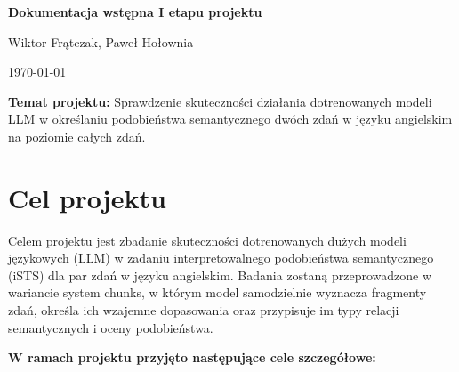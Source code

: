 \documentclass[a4paper,10pt]{article}
\begin{document}
    {\centering
        \setlength{\parskip}{0pt}
        {\Large\bfseries Dokumentacja wstępna I etapu projektu}\par
        Wiktor Frątczak, Paweł Hołownia\par
        \quad\today\par
        \vspace{8pt}
        \textbf{Temat projektu:} Sprawdzenie skuteczności działania dotrenowanych
        modeli LLM w określaniu podobieństwa semantycznego dwóch zdań w języku
        angielskim na poziomie całych zdań.\par
    }


\section{Cel projektu}

Celem projektu jest zbadanie skuteczności dotrenowanych
dużych modeli językowych (LLM) w zadaniu interpretowalnego
podobieństwa semantycznego (iSTS) dla par zdań w języku
angielskim. Badania zostaną przeprowadzone w wariancie
system chunks, w którym model samodzielnie
wyznacza fragmenty zdań, określa ich wzajemne dopasowania
oraz przypisuje im typy relacji semantycznych i oceny
podobieństwa.

\textbf{W ramach projektu przyjęto następujące cele szczegółowe:}
\end{document}

